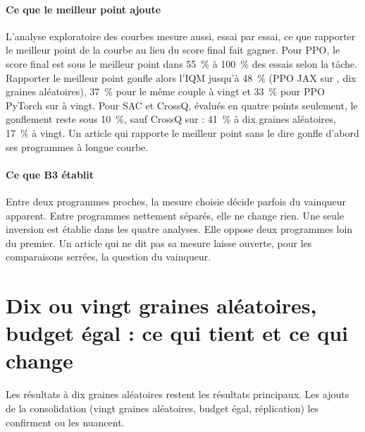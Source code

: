 \paragraph{Ce que le meilleur point ajoute}
L'analyse exploratoire des courbes mesure aussi, essai par essai, ce que rapporter le meilleur point de la
courbe au lieu du score final fait gagner. Pour PPO, le score final est sous le meilleur point dans
55~\% à 100~\% des essais selon la tâche. Rapporter le meilleur point gonfle alors l'IQM jusqu'à 48~\% (PPO
JAX sur , dix graines aléatoires), 37~\% pour le même couple à vingt et 33~\% pour PPO PyTorch
sur  à vingt. Pour SAC et CrossQ, évalués en quatre points seulement, le gonflement reste sous
10~\%, sauf CrossQ sur  : 41~\% à dix graines aléatoires, 17~\% à vingt. Un article qui rapporte
le meilleur point sans le dire gonfle d'abord ses programmes à longue courbe.

\paragraph{Ce que B3 établit}
Entre deux programmes proches, la mesure choisie décide parfois du vainqueur apparent. Entre programmes
nettement séparés, elle ne change rien. Une seule inversion est établie dans les quatre analyses. Elle
oppose deux programmes loin du premier. Un article qui ne dit pas sa mesure laisse ouverte, pour les
comparaisons serrées, la question du vainqueur.

\section{Dix ou vingt graines aléatoires, budget égal : ce qui tient et ce qui change}\label{sec:consolidation}

Les résultats à dix graines aléatoires restent les résultats principaux. Les ajouts de la consolidation
(vingt graines aléatoires, budget égal, réplication) les confirment ou les nuancent.

